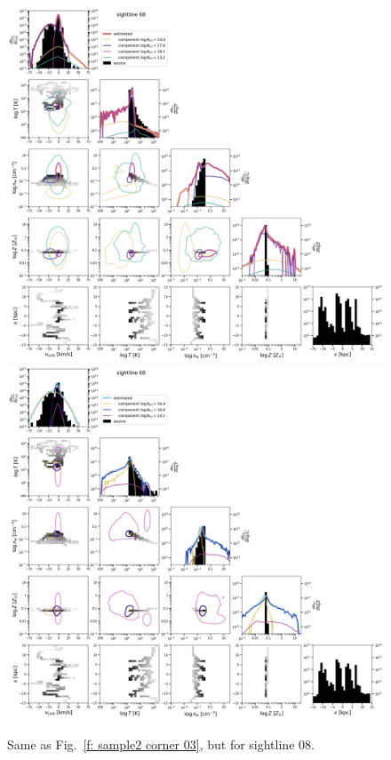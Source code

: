 \documentclass[fleqn,usenatbib]{mnras}
\begin{document}
\begin{figure}
    \centering
    \includegraphics[height=0.45\textheight]{figures/sample2/original/sightline_0008.png}
    \includegraphics[height=0.45\textheight]{figures/sample2/high-z/sightline_0008.png}
    \label{f: sample2 08 corner}
    \caption{Same as Fig.~\ref{f: sample2 corner 03}, but for sightline 08.}
\end{figure}
\end{document}

